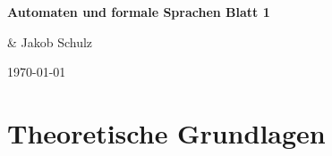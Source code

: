 \documentclass[a4paper,12pt,titlepage]{article}
\begin{document}
\begin{titlepage}
    \centering
    \vspace*{2cm}
    {\LARGE\bfseries Automaten und formale Sprachen Blatt 1\par}
    \vspace{2cm}
    {\Large \& Jakob Schulz\par}
    \vspace{2cm}
    {\large\today\par}
\end{titlepage}

\section{Theoretische Grundlagen}
\end{document}
